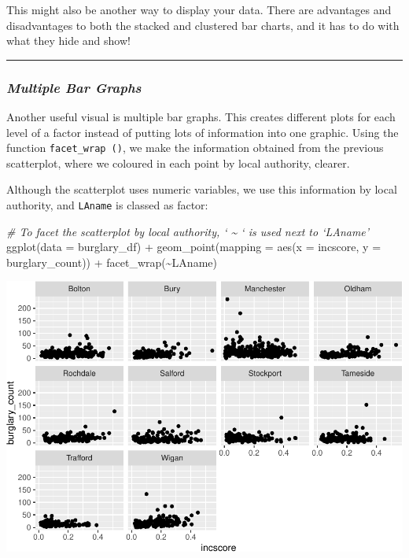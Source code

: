 \documentclass[
]{book}
\newenvironment{Shaded}{\begin{snugshade}}{\end{snugshade}}
\newcommand{\AttributeTok}[1]{\textcolor[rgb]{0.77,0.63,0.00}{#1}}
\newcommand{\CommentTok}[1]{\textcolor[rgb]{0.56,0.35,0.01}{\textit{#1}}}
\newcommand{\FunctionTok}[1]{\textcolor[rgb]{0.00,0.00,0.00}{#1}}
\newcommand{\NormalTok}[1]{#1}
\newcommand{\SpecialCharTok}[1]{\textcolor[rgb]{0.00,0.00,0.00}{#1}}
\begin{document}
This might also be another way to display your data. There are advantages and disadvantages to both the stacked and clustered bar charts, and it has to do with what they hide and show!

\begin{center}\rule{0.5\linewidth}{0.5pt}\end{center}

\hypertarget{multiple-bar-graphs}{%
\subsubsection{\texorpdfstring{\emph{Multiple Bar Graphs}}{Multiple Bar Graphs}}\label{multiple-bar-graphs}}

Another useful visual is multiple bar graphs. This creates different plots for each level of a factor instead of putting lots of information into one graphic. Using the function \texttt{facet\_wrap\ ()}, we make the information obtained from the previous scatterplot, where we coloured in each point by local authority, clearer.

Although the scatterplot uses numeric variables, we use this information by local authority, and \texttt{LAname} is classed as factor:

\begin{Shaded}
\begin{Highlighting}[]
\CommentTok{\# To facet the scatterplot by local authority, ‘ \textasciitilde{} ‘ is used next to ‘LAname’}
\FunctionTok{ggplot}\NormalTok{(}\AttributeTok{data =}\NormalTok{ burglary\_df) }\SpecialCharTok{+} 
  \FunctionTok{geom\_point}\NormalTok{(}\AttributeTok{mapping =} \FunctionTok{aes}\NormalTok{(}\AttributeTok{x =}\NormalTok{ incscore, }\AttributeTok{y =}\NormalTok{ burglary\_count)) }\SpecialCharTok{+} 
  \FunctionTok{facet\_wrap}\NormalTok{(}\SpecialCharTok{\textasciitilde{}}\NormalTok{LAname)}
\end{Highlighting}
\end{Shaded}

\includegraphics{03-data-visualisation_files/figure-latex/unnamed-chunk-17-1.pdf}
\end{document}
